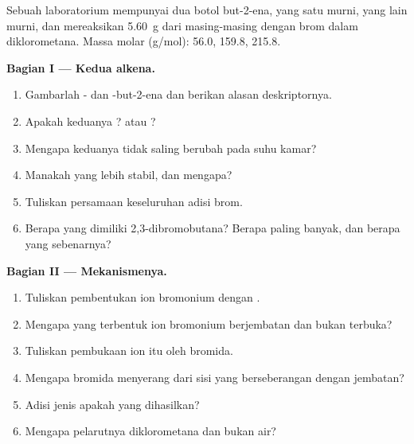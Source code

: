 \begin{problem}
\label{pb:b1:electrophilic-additions:1}
Sebuah laboratorium mempunyai dua botol but-2-ena, yang satu 
murni, yang lain  murni, dan mereaksikan \qty{5.60}{g} dari
masing-masing dengan brom dalam diklorometana. Massa molar
(\unit{g/mol}):  56.0,  159.8,  215.8.

\medskip
\noindent\textbf{Bagian I --- Kedua alkena.}
\begin{enumerate}
  \item Gambarlah - dan -but-2-ena dan berikan alasan
        deskriptornya.
  \item Apakah keduanya ?  atau ?
  \item Mengapa keduanya tidak saling berubah pada suhu kamar?
  \item Manakah yang lebih stabil, dan mengapa?
  \item Tuliskan persamaan keseluruhan adisi brom.
  \item Berapa  yang dimiliki 2,3-dibromobutana? Berapa
         paling banyak, dan berapa yang sebenarnya?
\end{enumerate}

\medskip
\noindent\textbf{Bagian II --- Mekanismenya.}
\begin{enumerate}[resume]
  \item Tuliskan pembentukan ion bromonium dengan .
  \item Mengapa yang terbentuk ion bromonium berjembatan dan bukan
         terbuka?
  \item Tuliskan pembukaan ion itu oleh bromida.
  \item Mengapa bromida menyerang dari sisi yang berseberangan dengan
        jembatan?
  \item Adisi jenis apakah yang dihasilkan?
  \item Mengapa pelarutnya diklorometana dan bukan air?
\end{enumerate}


\end{problem}
